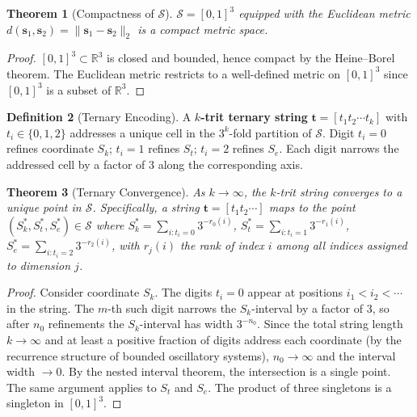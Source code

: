 \documentclass[11pt,a4paper]{article}
\newtheorem{theorem}{Theorem}[section]
\theoremstyle{definition}
\newtheorem{definition}[theorem]{Definition}
\theoremstyle{remark}
\newcommand{\Sk}{S_k}
\newcommand{\St}{S_t}
\newcommand{\Se}{S_e}
\newcommand{\Sspace}{\mathcal{S}}
\begin{document}
\begin{theorem}[Compactness of $\Sspace$]
\label{thm:compact}
$\Sspace = [0,1]^3$ equipped with the Euclidean metric $d(\mathbf{s}_1, \mathbf{s}_2) = \|\mathbf{s}_1 - \mathbf{s}_2\|_2$ is a compact metric space.
\end{theorem}

\begin{proof}
$[0,1]^3 \subset \mathbb{R}^3$ is closed and bounded, hence compact by the Heine--Borel theorem. The Euclidean metric restricts to a well-defined metric on $[0,1]^3$ since $[0,1]^3$ is a subset of $\mathbb{R}^3$.
\end{proof}

\begin{definition}[Ternary Encoding]
\label{def:ternary}
A \textbf{$k$-trit ternary string} $\mathbf{t} = [t_1 t_2 \cdots t_k]$ with $t_i \in \{0, 1, 2\}$ addresses a unique cell in the $3^k$-fold partition of $\Sspace$. Digit $t_i = 0$ refines coordinate $\Sk$; $t_i = 1$ refines $\St$; $t_i = 2$ refines $\Se$. Each digit narrows the addressed cell by a factor of 3 along the corresponding axis.
\end{definition}

\begin{theorem}[Ternary Convergence]
\label{thm:ternary}
As $k \to \infty$, the $k$-trit string converges to a unique point in $\Sspace$. Specifically, a string $\mathbf{t} = [t_1 t_2 \cdots]$ maps to the point $(\Sk^*, \St^*, \Se^*) \in \Sspace$ where $\Sk^* = \sum_{i : t_i = 0} 3^{-r_0(i)}$, $\St^* = \sum_{i : t_i = 1} 3^{-r_1(i)}$, $\Se^* = \sum_{i : t_i = 2} 3^{-r_2(i)}$, with $r_j(i)$ the rank of index $i$ among all indices assigned to dimension $j$.
\end{theorem}

\begin{proof}
Consider coordinate $\Sk$. The digits $t_i = 0$ appear at positions $i_1 < i_2 < \cdots$ in the string. The $m$-th such digit narrows the $\Sk$-interval by a factor of 3, so after $n_0$ refinements the $\Sk$-interval has width $3^{-n_0}$. Since the total string length $k \to \infty$ and at least a positive fraction of digits address each coordinate (by the recurrence structure of bounded oscillatory systems), $n_0 \to \infty$ and the interval width $\to 0$. By the nested interval theorem, the intersection is a single point. The same argument applies to $\St$ and $\Se$. The product of three singletons is a singleton in $[0,1]^3$.
\end{proof}
\end{document}

